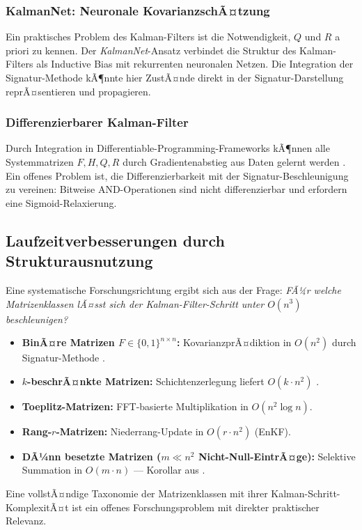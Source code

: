 ﻿\documentclass[a4paper,12pt]{article}
\theoremstyle{definition}
\begin{document}
\subsubsection{KalmanNet: Neuronale KovarianzschÃ¤tzung}

Ein praktisches Problem des Kalman-Filters ist die Notwendigkeit, $Q$ und $R$
a priori zu kennen. Der \emph{KalmanNet}-Ansatz \cite{revach2022} verbindet die
Struktur des Kalman-Filters als Inductive Bias mit rekurrenten neuronalen Netzen.
Die Integration der Signatur-Methode kÃ¶nnte hier ZustÃ¤nde direkt in der
Signatur-Darstellung reprÃ¤sentieren und propagieren.

\subsubsection{Differenzierbarer Kalman-Filter}

Durch Integration in Differentiable-Programming-Frameworks kÃ¶nnen alle Systemmatrizen
$F, H, Q, R$ durch Gradientenabstieg aus Daten gelernt werden \cite{haarnoja2016}.
Ein offenes Problem ist, die Differenzierbarkeit mit der Signatur-Beschleunigung
zu vereinen: Bitweise AND-Operationen sind nicht differenzierbar und erfordern
eine Sigmoid-Relaxierung.

\subsection{Laufzeitverbesserungen durch Strukturausnutzung}

Eine systematische Forschungsrichtung ergibt sich aus der Frage: \emph{FÃ¼r welche
Matrizenklassen lÃ¤sst sich der Kalman-Filter-Schritt unter $O(n^3)$ beschleunigen?}
\begin{itemize}
    \item \textbf{BinÃ¤re Matrizen $F \in \{0,1\}^{n\times n}$:} KovarianzprÃ¤diktion
          in $O(n^2)$ durch Signatur-Methode \cite{epp2026boolmm}.
    \item \textbf{$k$-beschrÃ¤nkte Matrizen:} Schichtenzerlegung liefert $O(k\cdot n^2)$
          \cite{epp2026boolmm}.
    \item \textbf{Toeplitz-Matrizen:} FFT-basierte Multiplikation in $O(n^2 \log n)$.
    \item \textbf{Rang-$r$-Matrizen:} Niederrang-Update in $O(r \cdot n^2)$ (EnKF).
    \item \textbf{DÃ¼nn besetzte Matrizen ($m \ll n^2$ Nicht-Null-EintrÃ¤ge):}
          Selektive Summation in $O(m \cdot n)$ --- Korollar aus \cite{epp2026boolmm}.
\end{itemize}
Eine vollstÃ¤ndige Taxonomie der Matrizenklassen mit ihrer Kalman-Schritt-KomplexitÃ¤t
ist ein offenes Forschungsproblem mit direkter praktischer Relevanz.
\end{document}
